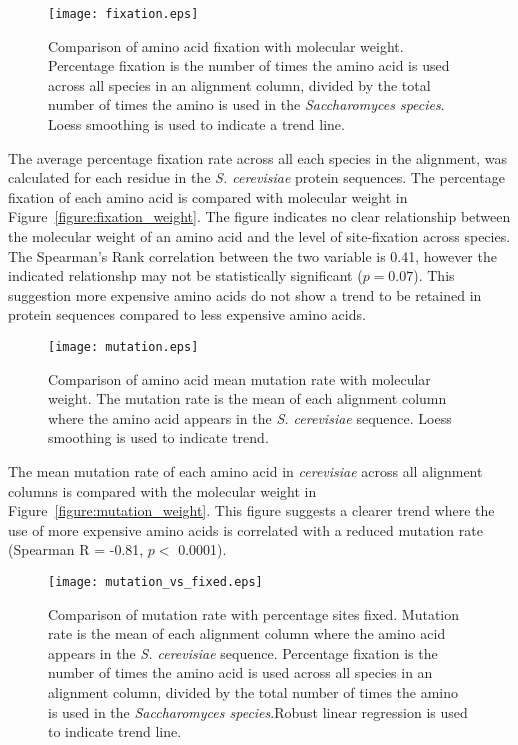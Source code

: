 \begin{figure}
  \centering
  \texttt{[image: fixation.eps]}
  \caption[Comparison of amino acid fixation with molecular weight]{Comparison of amino acid fixation with molecular weight. Percentage fixation is the number of times the amino acid is used across all species in an alignment column, divided by the total number of times the amino is used in the \emph{Saccharomyces species}. Loess smoothing is used to indicate a trend line.}
  \label{figure:fixation_weight}
\end{figure}

The average percentage fixation rate across all each species in the alignment, was calculated for each residue in the \emph{S. cerevisiae} protein sequences. The percentage fixation of each amino acid is compared with molecular weight in Figure~\vref{figure:fixation_weight}. The figure indicates no clear relationship between the molecular weight of an amino acid and the level of site-fixation across species. The Spearman's Rank correlation between the two variable is 0.41, however the indicated relationshp may not be statistically significant ($p = 0.07$). This suggestion more expensive amino acids do not show a trend to be retained in protein sequences compared to less expensive amino acids.

\begin{figure}
  \centering
  \texttt{[image: mutation.eps]}
  \caption[Comparison of amino acid mean mutation rate with molecular weight]{Comparison of amino acid mean mutation rate with molecular weight. The mutation rate is the mean of each alignment column where the amino acid appears in the \emph{S. cerevisiae} sequence. Loess smoothing is used to indicate trend.}
  \label{figure:mutation_weight}
\end{figure}

The mean mutation rate of each amino acid in \emph{cerevisiae} across all alignment columns is compared with the molecular weight in Figure~\vref{figure:mutation_weight}. This figure suggests a clearer trend where the use of more expensive amino acids is correlated with a reduced mutation rate (Spearman R = -0.81, $p <$ 0.0001).

\begin{figure}
  \centering
  \texttt{[image: mutation\_vs\_fixed.eps]}
  \caption[Comparison of mutation rate with percentage sites fixed]{Comparison of mutation rate with percentage sites fixed. Mutation rate is the mean of each alignment column where the amino acid appears in the \emph{S. cerevisiae} sequence. Percentage fixation is the number of times the amino acid is used across all species in an alignment column, divided by the total number of times the amino is used in the \emph{Saccharomyces species}.Robust linear regression is used to indicate trend line.}
  \label{figure:mutation_vs_fixed}
\end{figure}


